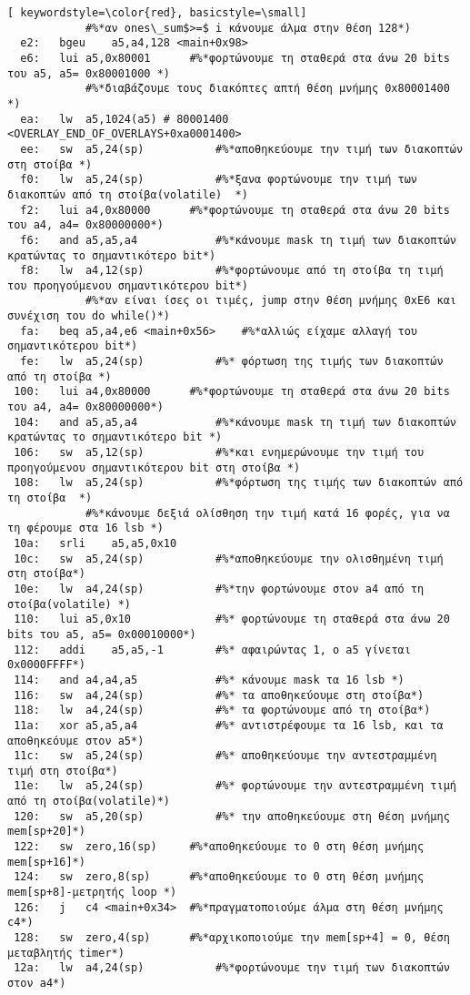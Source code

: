 \documentclass[a4paper]{article}
\begin{document}
\begin{lstlisting}[ keywordstyle=\color{red}, basicstyle=\small]
			#%*αν ones\_sum$>=$ i κάνουμε άλμα στην θέση 128*)	
  e2:	bgeu	a5,a4,128 <main+0x98>
  e6:	lui	a5,0x80001		#%*φορτώνουμε τη σταθερά στα άνω 20 bits του a5, a5= 0x80001000 *)
			#%*διαβάζουμε τους διακόπτες απτή θέση μνήμης 0x80001400 *)	
  ea:	lw	a5,1024(a5) # 80001400 <OVERLAY_END_OF_OVERLAYS+0xa0001400>
  ee:	sw	a5,24(sp)			#%*αποθηκεύουμε την τιμή των διακοπτών στη στοίβα *)	
  f0:	lw	a5,24(sp)			#%*ξανα φορτώνουμε την τιμή των διακοπτών από τη στοίβα(volatile)  *)	
  f2:	lui	a4,0x80000		#%*φορτώνουμε τη σταθερά στα άνω 20 bits του a4, a4= 0x80000000*)	
  f6:	and	a5,a5,a4			#%*κάνουμε mask τη τιμή των διακοπτών κρατώντας το σημαντικότερο bit*)	
  f8:	lw	a4,12(sp)			#%*φορτώνουμε από τη στοίβα τη τιμή του προηγούμενου σημαντικότερου bit*)	
			#%*αν είναι ίσες οι τιμές, jump στην θέση μνήμης 0xE6 και συνέχιση του do while()*)	
  fa:	beq	a5,a4,e6 <main+0x56>	#%*αλλιώς είχαμε αλλαγή του σημαντικότερου bit*)
  fe:	lw	a5,24(sp)			#%* φόρτωση της τιμής των διακοπτών από τη στοίβα *)	
 100:	lui	a4,0x80000		#%*φορτώνουμε τη σταθερά στα άνω 20 bits του a4, a4= 0x80000000*)	
 104:	and	a5,a5,a4			#%*κάνουμε mask τη τιμή των διακοπτών κρατώντας το σημαντικότερο bit *)	
 106:	sw	a5,12(sp)			#%*και ενημερώνουμε την τιμή του προηγούμενου σημαντικότερου bit στη στοίβα *)	
 108:	lw	a5,24(sp)			#%*φόρτωση της τιμής των διακοπτών από τη στοίβα  *)	
			#%*κάνουμε δεξιά ολίσθηση την τιμή κατά 16 φορές, για να τη φέρουμε στα 16 lsb *)	
 10a:	srli	a5,a5,0x10
 10c:	sw	a5,24(sp)			#%*αποθηκεύουμε την ολισθημένη τιμή στη στοίβα*)	
 10e:	lw	a4,24(sp)			#%*την φορτώνουμε στον a4 από τη στοίβα(volatile) *)	
 110:	lui	a5,0x10				#%* φορτώνουμε τη σταθερά στα άνω 20 bits του a5, a5= 0x00010000*)	
 112:	addi	a5,a5,-1		#%* αφαιρώντας 1, ο a5 γίνεται 0x0000FFFF*)	
 114:	and	a4,a4,a5			#%* κάνουμε mask τα 16 lsb *)	
 116:	sw	a4,24(sp)			#%* τα αποθηκεύουμε στη στοίβα*)	
 118:	lw	a4,24(sp)			#%* τα φορτώνουμε από τη στοίβα*)	
 11a:	xor	a5,a5,a4			#%* αντιστρέφουμε τα 16 lsb, και τα αποθηκεόυμε στον a5*)	
 11c:	sw	a5,24(sp)			#%* αποθηκεύουμε την αντεστραμμένη τιμή στη στοίβα*)	
 11e:	lw	a5,24(sp)			#%* φορτώνουμε την αντεστραμμένη τιμή από τη στοίβα(volatile)*)	
 120:	sw	a5,20(sp)			#%* την αποθηκεύουμε στη θέση μνήμης mem[sp+20]*)	
 122:	sw	zero,16(sp)		#%*αποθηκεύουμε το 0 στη θέση μνήμης mem[sp+16]*)	
 124:	sw	zero,8(sp)		#%*αποθηκεύουμε το 0 στη θέση μνήμης mem[sp+8]-μετρητής loop *)	
 126:	j	c4 <main+0x34>	#%*πραγματοποιούμε άλμα στη θέση μνήμης c4*)	
 128:	sw	zero,4(sp)		#%*αρχικοποιούμε την mem[sp+4] = 0, θέση μεταβλητής timer*)	
 12a:	lw	a4,24(sp)			#%*φορτώνουμε την τιμή των διακοπτών στον a4*)	

\end{lstlisting}
\end{document}
